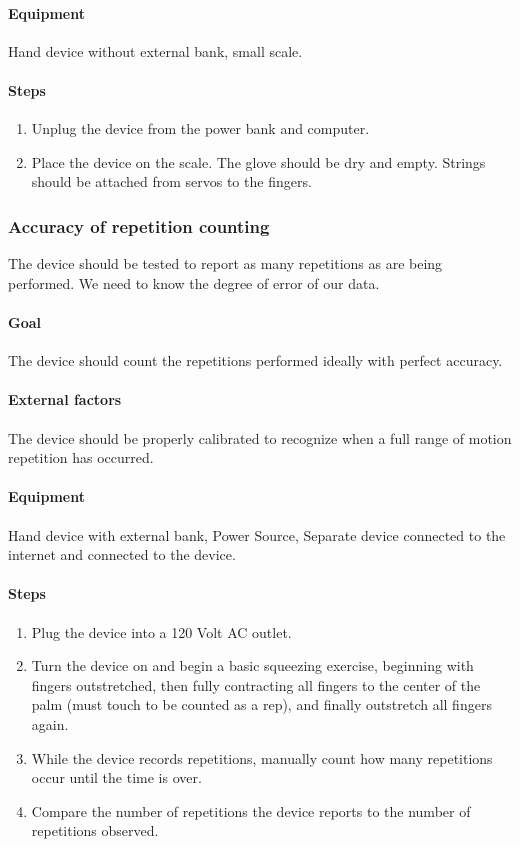 \documentclass{article}
\begin{document}
\paragraph{Equipment} Hand device without external bank, small scale.

\paragraph{Steps}
\begin{enumerate}
\item Unplug the device from the power bank and computer.
\item Place the device on the scale. The glove should be dry and empty. Strings should be attached from servos to the fingers.
\end{enumerate}

\subsubsection{Accuracy of repetition counting}
The device should be tested to report as many repetitions as are being performed. We need to know the degree of error of our data.

\paragraph{Goal} The device should count the repetitions performed ideally with perfect accuracy.

\paragraph{External factors} The device should be properly calibrated to recognize when a full range of motion repetition has occurred.

\paragraph{Equipment} Hand device with external bank, Power Source, Separate device connected to the internet and connected to the device.

\paragraph{Steps}
\begin{enumerate}
\item Plug the device into a 120 Volt AC outlet.
\item Turn the device on and begin a basic squeezing exercise, beginning with fingers outstretched, then fully contracting all fingers to the center of the palm (must touch to be counted as a rep), and finally outstretch all fingers again.
\item While the device records repetitions, manually count how many repetitions occur until the time is over.
\item Compare the number of repetitions the device reports to the number of repetitions observed.
\end{enumerate}
\end{document}
